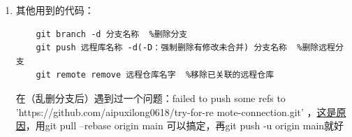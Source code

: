 \documentclass{article}
\begin{document}
\begin{enumerate}
\item 其他用到的代码：
\begin{lstlisting}
	git branch -d 分支名称  %删除分支
	git push 远程库名称 -d(-D：强制删除有修改未合并) 分支名称  %删除远程分支
	git remote remove 远程仓库名字  %移除已关联的远程仓库
\end{lstlisting}
在（乱删分支后）遇到过一个问题：failed to push some refs to 'https://github.com/aipuxilong0618/try-for-re
mote-connection.git' ，\href{https://www.cnblogs.com/Rainingday/p/12364690.html}{这是原因}，用git pull --rebase origin main
可以搞定，再git push -u origin main就好
\end{enumerate}
\end{document}
